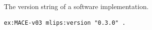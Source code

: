 The version string of a software implementation.
\begin{lstlisting}[language=turtle]
ex:MACE-v03 mlips:version "0.3.0" .
\end{lstlisting}
